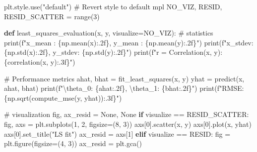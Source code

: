 \documentclass[
  letterpaper,
  DIV=11,
  numbers=noendperiod]{scrreprt}
\newenvironment{Shaded}{\begin{snugshade}}{\end{snugshade}}
\newcommand{\BuiltInTok}[1]{\textcolor[rgb]{0.00,0.23,0.31}{#1}}
\newcommand{\CharTok}[1]{\textcolor[rgb]{0.13,0.47,0.30}{#1}}
\newcommand{\CommentTok}[1]{\textcolor[rgb]{0.37,0.37,0.37}{#1}}
\newcommand{\ControlFlowTok}[1]{\textcolor[rgb]{0.00,0.23,0.31}{\textbf{#1}}}
\newcommand{\DecValTok}[1]{\textcolor[rgb]{0.68,0.00,0.00}{#1}}
\newcommand{\KeywordTok}[1]{\textcolor[rgb]{0.00,0.23,0.31}{\textbf{#1}}}
\newcommand{\NormalTok}[1]{\textcolor[rgb]{0.00,0.23,0.31}{#1}}
\newcommand{\OperatorTok}[1]{\textcolor[rgb]{0.37,0.37,0.37}{#1}}
\newcommand{\SpecialCharTok}[1]{\textcolor[rgb]{0.37,0.37,0.37}{#1}}
\newcommand{\SpecialStringTok}[1]{\textcolor[rgb]{0.13,0.47,0.30}{#1}}
\newcommand{\StringTok}[1]{\textcolor[rgb]{0.13,0.47,0.30}{#1}}
\newcommand{\VariableTok}[1]{\textcolor[rgb]{0.07,0.07,0.07}{#1}}
\begin{document}
\begin{Shaded}
\begin{Highlighting}[]
\NormalTok{plt.style.use(}\StringTok{"default"}\NormalTok{)  }\CommentTok{\# Revert style to default mpl}
\NormalTok{NO\_VIZ, RESID, RESID\_SCATTER }\OperatorTok{=} \BuiltInTok{range}\NormalTok{(}\DecValTok{3}\NormalTok{)}


\KeywordTok{def}\NormalTok{ least\_squares\_evaluation(x, y, visualize}\OperatorTok{=}\NormalTok{NO\_VIZ):}
    \CommentTok{\# statistics}
    \BuiltInTok{print}\NormalTok{(}\SpecialStringTok{f"x\_mean : }\SpecialCharTok{\{}\NormalTok{np}\SpecialCharTok{.}\NormalTok{mean(x)}\SpecialCharTok{:.2f\}}\SpecialStringTok{, y\_mean : }\SpecialCharTok{\{}\NormalTok{np}\SpecialCharTok{.}\NormalTok{mean(y)}\SpecialCharTok{:.2f\}}\SpecialStringTok{"}\NormalTok{)}
    \BuiltInTok{print}\NormalTok{(}\SpecialStringTok{f"x\_stdev: }\SpecialCharTok{\{}\NormalTok{np}\SpecialCharTok{.}\NormalTok{std(x)}\SpecialCharTok{:.2f\}}\SpecialStringTok{, y\_stdev: }\SpecialCharTok{\{}\NormalTok{np}\SpecialCharTok{.}\NormalTok{std(y)}\SpecialCharTok{:.2f\}}\SpecialStringTok{"}\NormalTok{)}
    \BuiltInTok{print}\NormalTok{(}\SpecialStringTok{f"r = Correlation(x, y): }\SpecialCharTok{\{}\NormalTok{correlation(x, y)}\SpecialCharTok{:.3f\}}\SpecialStringTok{"}\NormalTok{)}

    \CommentTok{\# Performance metrics}
\NormalTok{    ahat, bhat }\OperatorTok{=}\NormalTok{ fit\_least\_squares(x, y)}
\NormalTok{    yhat }\OperatorTok{=}\NormalTok{ predict(x, ahat, bhat)}
    \BuiltInTok{print}\NormalTok{(}\SpecialStringTok{f"}\CharTok{\textbackslash{}t}\SpecialStringTok{heta\_0: }\SpecialCharTok{\{}\NormalTok{ahat}\SpecialCharTok{:.2f\}}\SpecialStringTok{, }\CharTok{\textbackslash{}t}\SpecialStringTok{heta\_1: }\SpecialCharTok{\{}\NormalTok{bhat}\SpecialCharTok{:.2f\}}\SpecialStringTok{"}\NormalTok{)}
    \BuiltInTok{print}\NormalTok{(}\SpecialStringTok{f"RMSE: }\SpecialCharTok{\{}\NormalTok{np}\SpecialCharTok{.}\NormalTok{sqrt(compute\_mse(y, yhat))}\SpecialCharTok{:.3f\}}\SpecialStringTok{"}\NormalTok{)}

    \CommentTok{\# visualization}
\NormalTok{    fig, ax\_resid }\OperatorTok{=} \VariableTok{None}\NormalTok{, }\VariableTok{None}
    \ControlFlowTok{if}\NormalTok{ visualize }\OperatorTok{==}\NormalTok{ RESID\_SCATTER:}
\NormalTok{        fig, axs }\OperatorTok{=}\NormalTok{ plt.subplots(}\DecValTok{1}\NormalTok{, }\DecValTok{2}\NormalTok{, figsize}\OperatorTok{=}\NormalTok{(}\DecValTok{8}\NormalTok{, }\DecValTok{3}\NormalTok{))}
\NormalTok{        axs[}\DecValTok{0}\NormalTok{].scatter(x, y)}
\NormalTok{        axs[}\DecValTok{0}\NormalTok{].plot(x, yhat)}
\NormalTok{        axs[}\DecValTok{0}\NormalTok{].set\_title(}\StringTok{"LS fit"}\NormalTok{)}
\NormalTok{        ax\_resid }\OperatorTok{=}\NormalTok{ axs[}\DecValTok{1}\NormalTok{]}
    \ControlFlowTok{elif}\NormalTok{ visualize }\OperatorTok{==}\NormalTok{ RESID:}
\NormalTok{        fig }\OperatorTok{=}\NormalTok{ plt.figure(figsize}\OperatorTok{=}\NormalTok{(}\DecValTok{4}\NormalTok{, }\DecValTok{3}\NormalTok{))}
\NormalTok{        ax\_resid }\OperatorTok{=}\NormalTok{ plt.gca()}


\end{Highlighting}
\end{Shaded}
\end{document}
